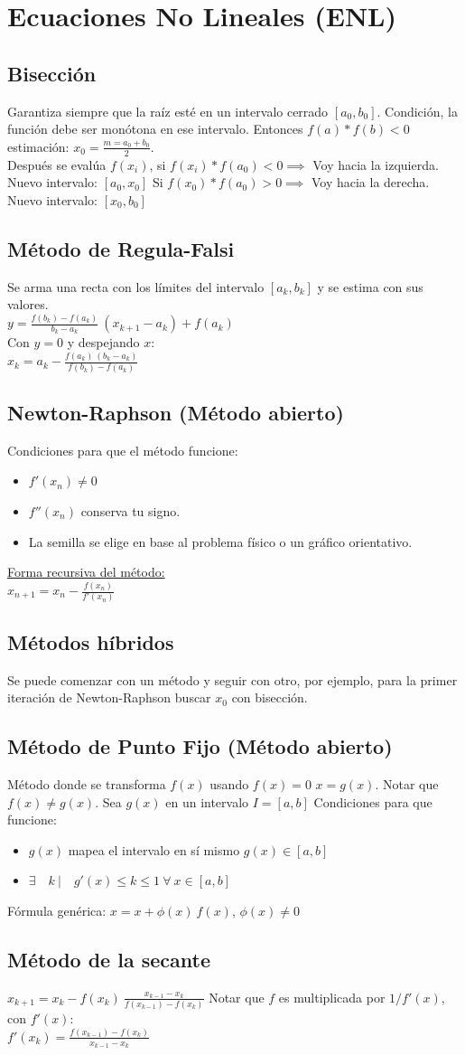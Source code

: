 \section{Ecuaciones No Lineales (ENL)}

\subsection{Bisección}
Garantiza siempre que la raíz esté en un intervalo cerrado $[a_0, b_0]$.
Condición, la función debe ser monótona en ese intervalo. Entonces $f(a)*f(b)<0$\\
estimación: $x_0=\frac{m=a_0+b_0}{2}$.\\
Después se evalúa $f(x_i)$, si $f(x_i)*f(a_0)<0\implies$ Voy hacia la izquierda. Nuevo intervalo: $[a_0, x_0]$
Si $f(x_0)*f(a_0)>0\implies$ Voy hacia la derecha. Nuevo intervalo: $[x_0,b_0]$
\subsection{Método de Regula-Falsi}
Se arma una recta con los límites del intervalo $[a_k, b_k]$ y se estima con sus valores.\\
$y=\frac{f(b_k)-f(a_k)}{b_k-a_k}\ (x_{k+1}-a_k)+f(a_k)$\\
Con $y=0$ y despejando $x$:\\
$x_k=a_k-\frac{f(a_k)\ (b_k-a_k)}{f(b_k)-f(a_k)}$
\subsection{Newton-Raphson (Método abierto)}
Condiciones para que el método funcione:
\begin{itemize}
    \item $f'(x_n) \ne 0$
    \item $f''(x_n)$ conserva tu signo.
    \item La semilla se elige en base al problema físico o un gráfico orientativo.
\end{itemize}
\underline{Forma recursiva del método:}\\
$x_{n+1}=x_n-\frac{f(x_n)}{f'(x_n)}$
\subsection{Métodos híbridos}
Se puede comenzar con un método y seguir con otro, por ejemplo, para la primer iteración
de Newton-Raphson buscar $x_0$ con bisección.

\subsection{Método de Punto Fijo (Método abierto)}
Método donde se transforma $f(x)$ usando $f(x)=0$ $x=g(x)$. Notar que $f(x)\ne g(x)$.
Sea $g(x)$ en un intervalo $I=[a,b]$
Condiciones para que funcione:
\begin{itemize}
    \item $g(x)$ mapea el intervalo en sí mismo $g(x)\in[a,b]$
    \item $\exists \quad k\ \big| \quad g'(x)\le k\le 1\ \forall\ x \in [a,b]$
\end{itemize}
Fórmula genérica: $x=x+\phi(x)\ f(x)$, $\phi(x)\ne 0$
\subsection{Método de la secante}
$x_{k+1}=x_k-f(x_k)\ \frac{x_{k-1}-x_k}{f(x_{k-1})-f(x_k)}$
Notar que $f$ es multiplicada por $1/f'(x)$, con $f'(x)$:\\
$f'(x_k)=\frac{f(x_{k-1})-f(x_k)}{x_{k-1}-x_k}$